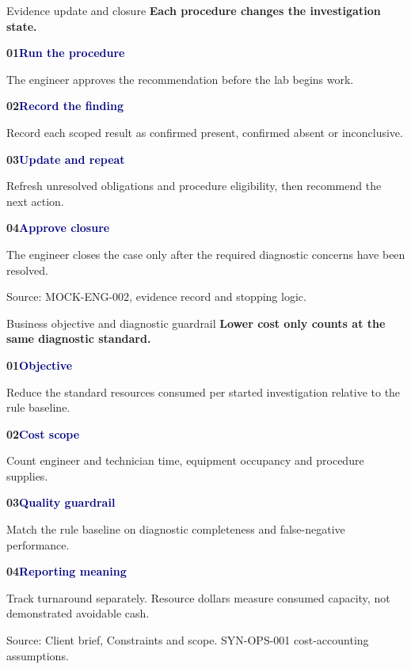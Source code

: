 \documentclass[aspectratio=169,10pt]{beamer}
\newcommand{\source}[1]{\vfill{\fontsize{6.2}{7.5}\selectfont\color{Muted}Source: #1\par}}
\newcommand{\seqitem}[3]{%
  {\normalsize\bfseries\color{Teal}#1\quad\textcolor{Navy}{#2}}\par
  \vspace{0.6mm}
  {\small #3}\par}
\newcommand{\seqrule}{%
  \vspace{1mm}{\color{RuleGrey}\rule{\textwidth}{0.45pt}}\vspace{1mm}}
\begin{document}
\begin{frame}[t]{Evidence update and closure}
  \vspace{2mm}
  {\Large\bfseries Each procedure changes the investigation state.}\par
  \vspace{4mm}

  \seqitem{01}{Run the procedure}
    {The engineer approves the recommendation before the lab begins work.}

  \seqrule

  \seqitem{02}{Record the finding}
    {Record each scoped result as confirmed present, confirmed absent or inconclusive.}

  \seqrule

  \seqitem{03}{Update and repeat}
    {Refresh unresolved obligations and procedure eligibility, then recommend the next action.}

  \seqrule

  \seqitem{04}{Approve closure}
    {The engineer closes the case only after the required diagnostic concerns have been resolved.}

  \source{MOCK-ENG-002, evidence record and stopping logic.}
\end{frame}

\begin{frame}[t]{Business objective and diagnostic guardrail}
  \vspace{1mm}
  {\Large\bfseries Lower cost only counts at the same diagnostic standard.}\par
  \vspace{1mm}

  \seqitem{01}{Objective}
    {Reduce the standard resources consumed per started investigation relative to the rule baseline.}

  \seqrule

  \seqitem{02}{Cost scope}
    {Count engineer and technician time, equipment occupancy and procedure supplies.}

  \seqrule

  \seqitem{03}{Quality guardrail}
    {Match the rule baseline on diagnostic completeness and false-negative performance.}

  \seqrule

  \seqitem{04}{Reporting meaning}
    {Track turnaround separately. Resource dollars measure consumed capacity, not demonstrated avoidable cash.}


  \source{Client brief, Constraints and scope. SYN-OPS-001 cost-accounting assumptions.}
\end{frame}
\end{document}
